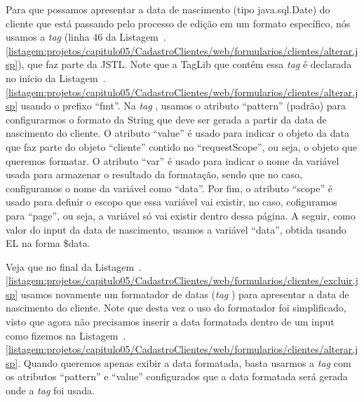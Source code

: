 
Para que possamos apresentar a data de nascimento (tipo java.sql.Date) do cliente que está passando pelo processo de edição em um formato específico, nós usamos a \textit{tag}  (linha 46 da Listagem~\thechapter.\ref{listagem:projetos/capitulo05/CadastroClientes/web/formularios/clientes/alterar.jsp}), que faz parte da JSTL. Note que a TagLib que contém essa \textit{tag} é declarada no início da Listagem~\thechapter.\ref{listagem:projetos/capitulo05/CadastroClientes/web/formularios/clientes/alterar.jsp} usando o prefixo ``fmt''. Na \textit{tag} , usamos o atributo ``pattern'' (padrão) para configurarmos o formato da String que deve ser gerada a partir da data de nascimento do cliente. O atributo ``value'' é usado para indicar o objeto da data que faz parte do objeto ``cliente'' contido no ``requestScope'', ou seja, o objeto que queremos formatar. O atributo ``var'' é usado para indicar o nome da variável usada para armazenar o resultado da formatação, sendo que no caso, configuramos o nome da variável como ``data''. Por fim, o atributo ``scope'' é usado para definir o escopo que essa variável vai existir, no caso, cofiguramos para ``page'', ou seja, a variável só vai existir dentro dessa página. A seguir, como valor do input da data de nascimento, usamos a variável ``data'', obtida usando EL na forma \${data}.


Veja que no final da Listagem~\thechapter.\ref{listagem:projetos/capitulo05/CadastroClientes/web/formularios/clientes/excluir.jsp} usamos novamente um formatador de datas (\textit{tag} ) para apresentar a data de nascimento do cliente. Note que desta vez o uso do formatador foi simplificado, visto que agora não precisamos inserir a data formatada dentro de um input como fizemos na Listagem~\thechapter.\ref{listagem:projetos/capitulo05/CadastroClientes/web/formularios/clientes/alterar.jsp}. Quando queremos apenas exibir a data formatada, basta usarmos a \textit{tag}  com os atributos ``pattern'' e ``value'' configurados que a data formatada será gerada onde a \textit{tag} foi usada.

